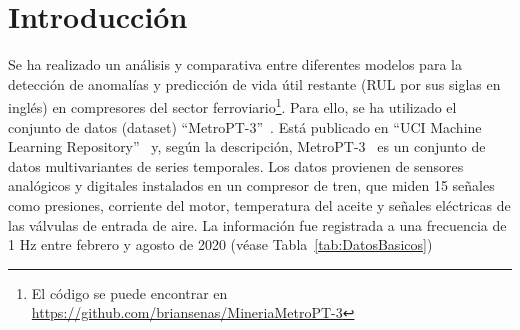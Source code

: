 \documentclass[12pt,letterpaper]{article}
\begin{document}
\hypertarget{Indice}{}
\tableofcontents
\newpage
\section{Introducción}
Se ha realizado un análisis y comparativa entre diferentes modelos para la detección de anomalías y predicción de vida útil restante (RUL por sus siglas en inglés)
en compresores del sector ferroviario\footnote{El código se puede encontrar en \url{https://github.com/briansenas/MineriaMetroPT-3}}. Para ello, se ha utilizado el conjunto de datos (dataset) ``MetroPT-3''~\cite{MetroPT-3}.
Está publicado en ``UCI Machine Learning Repository''~\cite{UCIMLR} y, según la descripción, MetroPT-3~\cite{MetroPT-3} es un conjunto de datos multivariantes de series temporales. Los datos provienen de sensores analógicos y digitales 
instalados en un compresor de tren, que miden 15 señales como presiones, corriente del motor, temperatura del aceite y señales eléctricas de las válvulas de entrada de aire. 
La información fue registrada a una frecuencia de 1 Hz entre febrero y agosto de 2020 (véase Tabla~\ref{tab:DatosBasicos})
\end{document}
